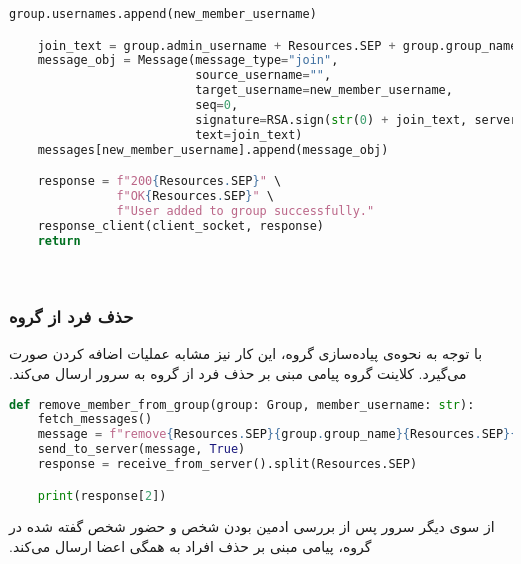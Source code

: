 \begin{latin}
\begin{lstlisting}[firstnumber=250, language=Python]
    group.usernames.append(new_member_username)

    join_text = group.admin_username + Resources.SEP + group.group_name + Resources.SEP + json.dumps(group.usernames)
    message_obj = Message(message_type="join",
                          source_username="",
                          target_username=new_member_username,
                          seq=0,
                          signature=RSA.sign(str(0) + join_text, server_private_key),
                          text=join_text)
    messages[new_member_username].append(message_obj)

    response = f"200{Resources.SEP}" \
               f"OK{Resources.SEP}" \
               f"User added to group successfully."
    response_client(client_socket, response)
    return
\end{lstlisting}
\end{latin}
‫
‫\subsubsection{حذف فرد از گروه}
‫با توجه به نحوه‌ی پیاده‌سازی گروه، این کار نیز مشابه عملیات اضافه کردن صورت می‌گیرد. کلاینت گروه پیامی مبنی بر حذف فرد از گروه به سرور ارسال می‌کند.
‫
\begin{latin}
\begin{lstlisting}[firstnumber=1, language=Python]
def remove_member_from_group(group: Group, member_username: str):
    fetch_messages()
    message = f"remove{Resources.SEP}{group.group_name}{Resources.SEP}{member_username}"
    send_to_server(message, True)
    response = receive_from_server().split(Resources.SEP)

    print(response[2])
\end{lstlisting}
\end{latin}

‫از سوی دیگر سرور پس از بررسی ادمین بودن شخص و حضور شخص گفته شده در گروه، پیامی مبنی بر حذف افراد به همگی اعضا ارسال می‌کند.


